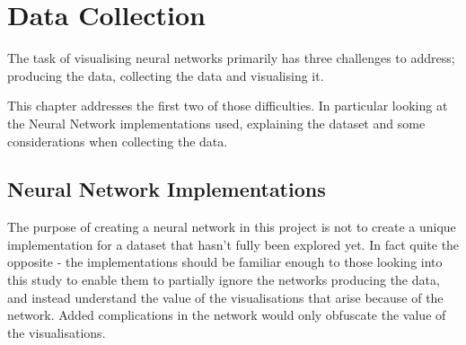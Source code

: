 \documentclass[a4paper,11pt,titlepage]{article}
\begin{document}
\section{Data Collection}
	
	The task of visualising neural networks primarily has three challenges to address; producing the data, collecting the data and visualising it. 
	\par 
	This chapter addresses the first two of those difficulties. In particular looking at the Neural Network implementations used, explaining the dataset and some considerations when collecting the data.
	
	\subsection{Neural Network Implementations}
	The purpose of creating a neural network in this project is not to create a unique implementation for a dataset that hasn't fully been explored yet. In fact quite the opposite - the implementations should be familiar enough to those looking into this study to enable them to partially ignore the networks producing the data, and instead understand the value of the visualisations that arise because of the network. Added complications in the network would only obfuscate the value of the visualisations. 
	
	\begin{figure}[H]
    			\caption{}%
	\end{figure}	
\end{document}
